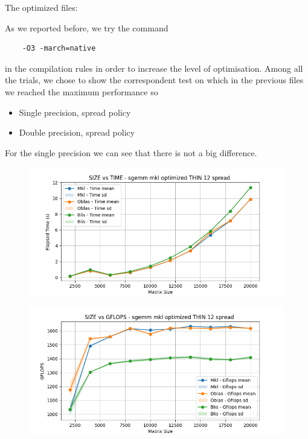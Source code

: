 \documentclass[12pt, titlepage]{report}
\begin{document}
The optimized files: 

As we reported before, we try the command 
\begin{verbatim}
    -O3 -march=native
\end{verbatim}
in the compilation rules in order to increase the level of optimisation. Among all the trials, we chose to show the correspondent test on which in the previous files we reached the maximum performance so 
\begin{itemize}
    \item Single precision, spread policy
    \item Double precision, spread policy
\end{itemize}

For the single precision we can see that there is not a big difference.
\begin{figure}[H]
    \centering
    \includegraphics[width=\textwidth]{THIN 12/sgemm_mkl_optimized_THIN_12_spread_time.png}
\end{figure}

\begin{figure}[H]
    \centering
    \includegraphics[width=\textwidth]{THIN 12/sgemm_mkl_optimized_THIN_12_spread_gflops.png}
\end{figure}
\end{document}
